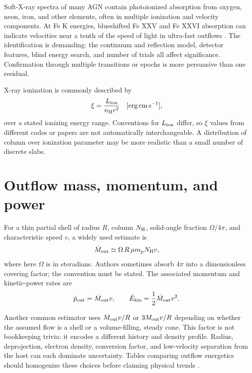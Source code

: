 Soft-X-ray spectra of many AGN contain photoionized absorption from oxygen,
neon, iron, and other elements, often in multiple ionization and velocity
components. At Fe K energies, blueshifted Fe XXV and Fe XXVI absorption can
indicate velocities near a tenth of the speed of light in ultra-fast outflows
\citep{Tombesi2010,KingPounds2015}. The identification is demanding: the
continuum and reflection model, detector features, blind energy search, and
number of trials all affect significance. Confirmation through multiple
transitions or epochs is more persuasive than one residual.

X-ray ionization is commonly described by
\begin{equation}
 \xi=\frac{L_{\rm ion}}{n_{\rm H}r^2}
 \quad [{\rm erg\,cm\,s^{-1}}],
 \label{eq:xi}
\end{equation}
over a stated ionizing energy range. Conventions for $L_{\rm ion}$ differ, so
$\xi$ values from different codes or papers are not automatically
interchangeable. A distribution of column over ionization parameter may be
more realistic than a small number of discrete slabs.

\section{Outflow mass, momentum, and power}

For a thin partial shell of radius $R$, column $N_{\rm H}$, solid-angle
fraction $\Omega/4\pi$, and characteristic speed $v$, a widely used estimate
is
\begin{equation}
 \dot{M}_{\rm out}\simeq
 \Omega\,R\,\mu m_{\rm p}N_{\rm H}v,
 \label{eq:outflow-rate}
\end{equation}
where here $\Omega$ is in steradians. Authors sometimes absorb $4\pi$ into a
dimensionless covering factor; the convention must be stated. The associated
momentum and kinetic-power rates are
\begin{equation}
 \dot{p}_{\rm out}=\dot{M}_{\rm out}v,\qquad
 \dot{E}_{\rm kin}=\frac{1}{2}\dot{M}_{\rm out}v^2.
 \label{eq:outflow-power}
\end{equation}

Another common estimator uses $M_{\rm out}v/R$ or $3M_{\rm out}v/R$ depending
on whether the assumed flow is a shell or a volume-filling, steady cone.
This factor is not bookkeeping trivia: it encodes a different history and
density profile. Radius, deprojection, electron density, conversion factor,
and low-velocity separation from the host can each dominate uncertainty.
Tables comparing outflow energetics should homogenize these choices before
claiming physical trends \citep{Veilleux2005,Fiore2017}.

